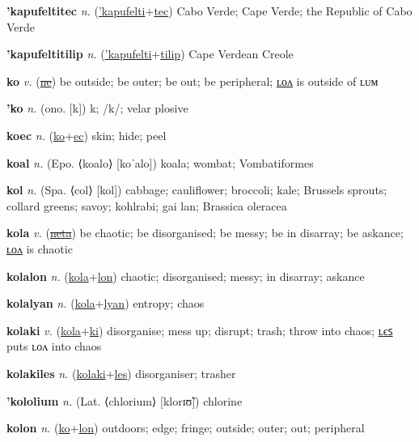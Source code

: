 \textbf{\hypertarget{'kapufeltitec}{'kapufeltitec}} \textit{n.} (\hyperlink{'kapufelti}{'kapufelti}+\allowbreak \hyperlink{tec}{tec})
Cabo Verde; Cape Verde; the Republic of Cabo Verde

\textbf{\hypertarget{'kapufeltitilip}{'kapufeltitilip}} \textit{n.} (\hyperlink{'kapufelti}{'kapufelti}+\allowbreak \hyperlink{tilip}{tilip})
Cape Verdean Creole

\textbf{\hypertarget{ko}{ko}} \textit{v.} (\hyperlink{ne}{\sout{ne}})
be outside; be outer; be out; be peripheral; \hyperlink{kolon}{ʟᴏᴧ} is outside of ʟᴜᴍ

\textbf{\hypertarget{'ko}{'ko}} \textit{n.} (ono. [k])
k; /k/; velar plosive

\textbf{\hypertarget{koec}{koec}} \textit{n.} (\hyperlink{ko}{ko}+\allowbreak \hyperlink{ec}{ec})
skin; hide; peel

\textbf{\hypertarget{koal}{koal}} \textit{n.} (Epo. ⟨koalo⟩ [koˈalo])
koala; wombat; Vombatiformes

\textbf{\hypertarget{kol}{kol}} \textit{n.} (Spa. ⟨col⟩ [kol])
cabbage; cauliflower; broccoli; kale; Brussels sprouts; collard greens; savoy; kohlrabi; gai lan; Brassica oleracea

\textbf{\hypertarget{kola}{kola}} \textit{v.} (\hyperlink{neta}{\sout{neta}})
be chaotic; be disorganised; be messy; be in disarray; be askance; \hyperlink{kolalon}{ʟᴏᴧ} is chaotic

\textbf{\hypertarget{kolalon}{kolalon}} \textit{n.} (\hyperlink{kola}{kola}+\allowbreak \hyperlink{lon}{lon})
chaotic; disorganised; messy; in disarray; askance

\textbf{\hypertarget{kolalyan}{kolalyan}} \textit{n.} (\hyperlink{kola}{kola}+\allowbreak \hyperlink{lyan}{lyan})
entropy; chaos

\textbf{\hypertarget{kolaki}{kolaki}} \textit{v.} (\hyperlink{kola}{kola}+\allowbreak \hyperlink{ki}{ki})
disorganise; mess up; disrupt; trash; throw into chaos; \hyperlink{kolakiles}{ʟєꜱ} puts ʟᴏᴧ into chaos

\textbf{\hypertarget{kolakiles}{kolakiles}} \textit{n.} (\hyperlink{kolaki}{kolaki}+\allowbreak \hyperlink{les}{les})
disorganiser; trasher

\textbf{\hypertarget{'kololium}{'kololium}} \textit{n.} (Lat. ⟨chlorium⟩ [klorɪʊ̃])
chlorine

\textbf{\hypertarget{kolon}{kolon}} \textit{n.} (\hyperlink{ko}{ko}+\allowbreak \hyperlink{lon}{lon})
outdoors; edge; fringe; outside; outer; out; peripheral

